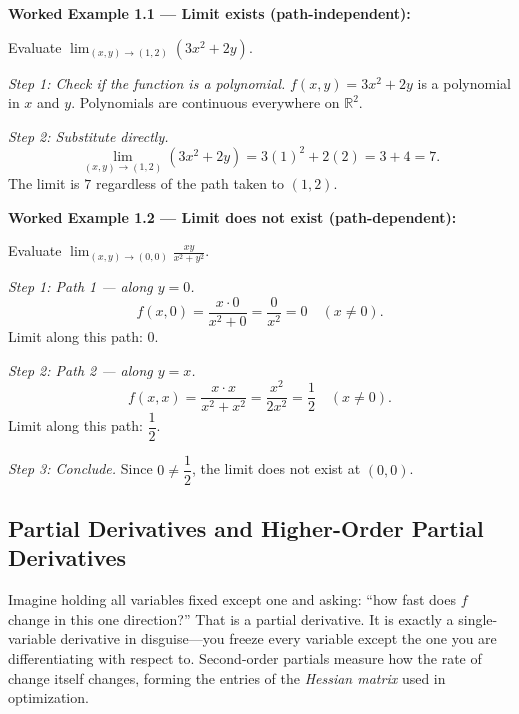 \documentclass[12pt,a4paper]{article}
\begin{document}
\textbf{Worked Example 1.1 --- Limit exists (path-independent):}

Evaluate \(\displaystyle\lim_{(x,y)\to(1,2)} (3x^2 + 2y)\).

\textit{Step 1: Check if the function is a polynomial.}
\(f(x,y) = 3x^2 + 2y\) is a polynomial in \(x\) and \(y\). Polynomials are continuous everywhere on \(\mathbb{R}^2\).

\textit{Step 2: Substitute directly.}
\[
\lim_{(x,y)\to(1,2)} (3x^2+2y) = 3(1)^2 + 2(2) = 3 + 4 = 7.
\]
The limit is \(7\) regardless of the path taken to \((1,2)\).

\textbf{Worked Example 1.2 --- Limit does not exist (path-dependent):}

Evaluate \(\displaystyle\lim_{(x,y)\to(0,0)} \frac{xy}{x^2+y^2}\).

\textit{Step 1: Path 1 --- along \(y = 0\).}
\[
f(x,0) = \frac{x \cdot 0}{x^2+0} = \frac{0}{x^2} = 0 \quad (x \neq 0).
\]
Limit along this path: \(0\).

\textit{Step 2: Path 2 --- along \(y = x\).}
\[
f(x,x) = \frac{x \cdot x}{x^2+x^2} = \frac{x^2}{2x^2} = \frac{1}{2} \quad (x \neq 0).
\]
Limit along this path: \(\dfrac{1}{2}\).

\textit{Step 3: Conclude.}
Since \(0 \neq \dfrac{1}{2}\), the limit does not exist at \((0,0)\).

\subsection{Partial Derivatives and Higher-Order Partial Derivatives}

Imagine holding all variables fixed except one and asking: ``how fast does \(f\) change in this one direction?'' That is a partial derivative. It is exactly a single-variable derivative in disguise---you freeze every variable except the one you are differentiating with respect to. Second-order partials measure how the rate of change itself changes, forming the entries of the \textit{Hessian matrix} used in optimization.
\end{document}
